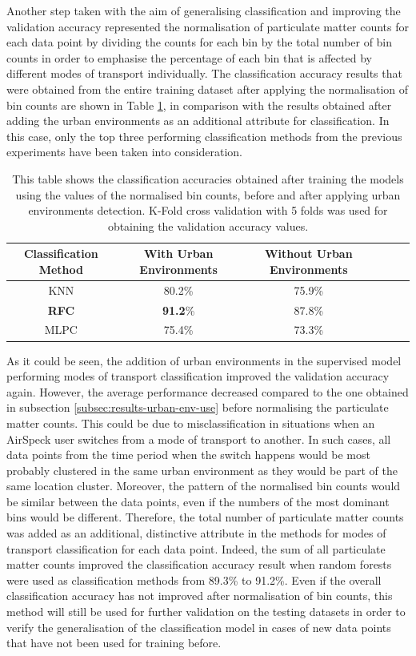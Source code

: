 \documentclass[bsc,frontabs,twoside,singlespacing, parskip,deptreport]{infthesis}     %
\begin{document}
Another step taken with the aim of generalising classification and improving the validation accuracy represented the normalisation of particulate matter counts for each data point by dividing the counts for each bin by the total number of bin counts in order to emphasise the percentage of each bin that is affected by different modes of transport individually. The classification accuracy results that were obtained from the entire training dataset after applying the normalisation of bin counts are shown in Table \ref{table:norm-bin-counts}, in comparison with the results obtained after adding the urban environments as an additional attribute for classification. In this case, only the top three performing classification methods from the previous experiments have been taken into consideration.


\begin{table}[h!]
\centering
 \begin{tabular}{||c | c | c | c | c | c||} 
 \hline
 Classification Method & With Urban Environments & Without Urban Environments \\ [0.5ex] 
 \hline\hline
 KNN & 80.2\% & 75.9\% \\
 \hline
 \textbf{RFC} & \textbf{91.2}\% & 87.8\% \\ 
 \hline
  MLPC & 75.4\% & 73.3\% \\ 
 \hline
\end{tabular}
\caption{This table shows the classification accuracies obtained after training the models using the values of the normalised bin counts, before and after applying urban environments detection. K-Fold cross validation with 5 folds was used for obtaining the validation accuracy values.}
\label{table:norm-bin-counts}
\end{table}

As it could be seen, the addition of urban environments in the supervised model performing modes of transport classification improved the validation accuracy again. However, the average performance decreased compared to the one obtained  in subsection \ref{subsec:results-urban-env-use} before normalising the particulate matter counts. This could be due to misclassification in situations when an AirSpeck user switches from a mode of transport to another. In such cases, all data points from the time period when the switch happens would be most probably clustered in the same urban environment as they would be part of the same location cluster. Moreover, the pattern of the normalised bin counts would be similar between the data points, even if the numbers of the most dominant bins would be different. Therefore, the total number of particulate matter counts was added as an additional, distinctive attribute in the methods for modes of transport classification for each data point. Indeed, the sum of all particulate matter counts improved the classification accuracy result when random forests were used as classification methods from 89.3\% to 91.2\%. Even if the overall classification accuracy has not improved after normalisation of bin counts, this method will still be used for further validation on the testing datasets in order to verify the generalisation of the classification model in cases of new data points that have not been used for training before. 
\end{document}
